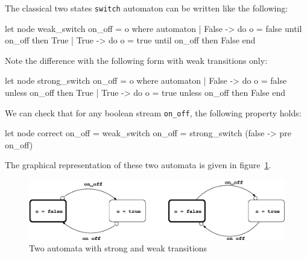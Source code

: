 \documentclass[11pt,titlepage,twoside]{report}
\begin{document}
The classical two states \verb-switch- automaton can be written like
the following:
\begin{runverbatim}
let node weak_switch on_off = o where
  automaton
  | False -> do o = false until on_off then True
  | True -> do o = true until on_off then False
  end
\end{runverbatim}

Note the difference with the following form with weak transitions only:
\begin{runverbatim}[continue]
let node strong_switch on_off = o where
  automaton
  | False -> do o = false unless on_off then True
  | True -> do o = true unless on_off then False
  end
\end{runverbatim}

We can check that for any boolean stream \verb-on_off-, the following
property holds:
\begin{runverbatim}
let node correct on_off =
weak_switch on_off = strong_switch (false -> pre on_off)
\end{runverbatim}
The graphical representation of these two automata is given in
figure~\cref{switch-figure}.

\begin{figure}
\begin{center}
\includegraphics[width=\textwidth]{Fig/automaton}
\end{center}
\caption{Two automata with strong and weak transitions~\label{switch-figure}}
\end{figure}

%
\end{document}
